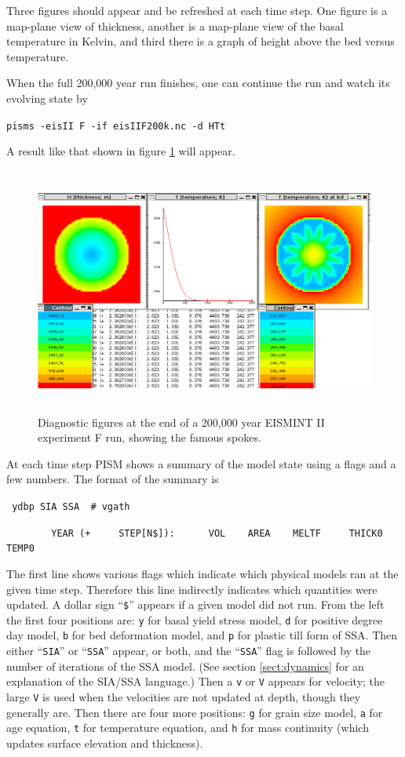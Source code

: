 \documentclass[11pt,final]{amsart}
\renewcommand{\t}[1]{\texttt{#1}}
\begin{document}
Three figures should appear and be refreshed at each time step.  One figure is a map-plane view of thickness, another is a map-plane view of the basal temperature in Kelvin, and third there is a graph of height above the bed versus temperature.

When the full 200,000 year run finishes, one can continue the run and watch its evolving state by

\verb|pisms -eisII F -if eisIIF200k.nc -d HTt|

\noindent A result like that shown in figure \ref{fig:screenshot} will appear.

\begin{figure}[ht]
\includegraphics[height=3.2in,keepaspectratio=true]{figs/eisIIFshot}
\caption{Diagnostic figures at the end of a 200,000 year EISMINT II experiment F run, showing the famous spokes.}
\label{fig:screenshot}
\end{figure}

At each time step PISM shows a summary of the model state using a flags and a few numbers.  The format of the summary is

\small
\verb| ydbp SIA SSA  # vgath|

\verb|        YEAR (+     STEP[N$]):      VOL    AREA    MELTF     THICK0     TEMP0|
\normalsize

\noindent The first line shows various flags which indicate which physical models ran at the given time step.  Therefore this line indirectly indicates which quantities were updated.  A dollar sign ``\t{\$}'' appears if a given model did not run.  From the left the first four positions are: \t{y} for basal yield stress model, \t{d} for positive degree day model, \t{b} for bed deformation model, and \t{p} for plastic till form of SSA.  Then either ``\verb|SIA|'' or ``\verb|SSA|'' appear, or both, and the ``\verb|SSA|'' flag is followed by the number of iterations of the SSA model.  (See section \ref{sect:dynamics} for an explanation of the SIA/SSA language.)  Then a \t{v} or \t{V} appears for velocity; the large \t{V} is used when the velocities are not updated at depth, though they generally are.  Then there are four more positions: \t{g} for grain size model, \t{a} for age equation, \t{t} for temperature equation, and \t{h} for mass continuity (which updates surface elevation and thickness).
\end{document}
